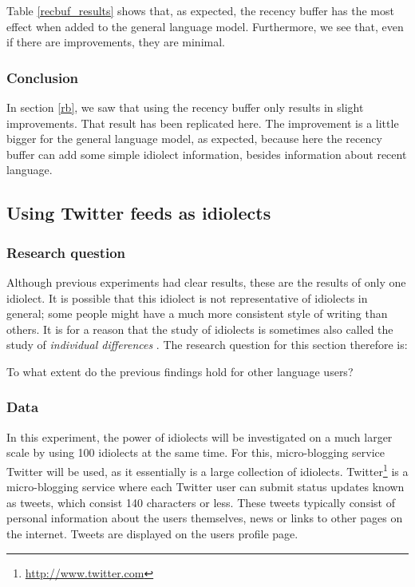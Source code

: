 \documentclass[12pt]{article}
\begin{document}
Table \ref{recbuf_results} shows that, as expected, the recency buffer has the most effect when added to the general language model. Furthermore, we see that, even if there are improvements, they are minimal.

\subsubsection{Conclusion}
In section \ref{rb}, we saw that using the recency buffer only results in slight improvements. That result has been replicated here. The improvement is a little bigger for the general language model, as expected, because here the recency buffer can add some simple idiolect information, besides information about recent language.

\subsection{Using Twitter feeds as idiolects} \label{twitter_idiolects}

\subsubsection{Research question}
Although previous experiments had clear results, these are the results of only one idiolect. It is possible that this idiolect is not representative of idiolects in general; some people might have a much more consistent style of writing than others. It is for a reason that the study of idiolects is sometimes also called the study of \emph{individual differences} \cite{barlow10}. The research question for this section therefore is:

\begin{examples}
\item To what extent do the previous findings hold for other language users?
\end{examples}

\subsubsection{Data} \label{data_twitter_idiolects}
In this experiment, the power of idiolects will be investigated on a much larger scale by using 100 idiolects at the same time. For this, micro-blogging service Twitter will be used, as it essentially is a large collection of idiolects. Twitter\footnote{\url{http://www.twitter.com}} is a micro-blogging service where each Twitter user can submit status updates known as tweets, which consist 140 characters or less. These tweets typically consist of personal information about the users themselves, news or links to other pages on the internet. Tweets are displayed on the users profile page. 
\end{document}
